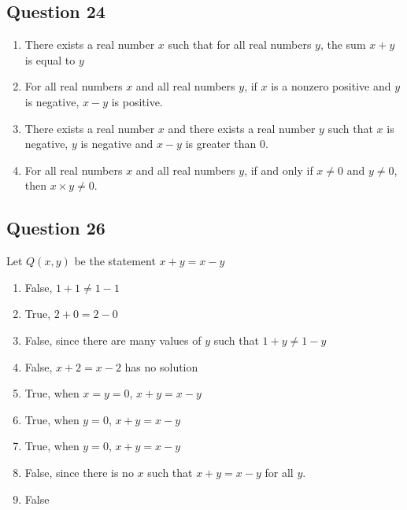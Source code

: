 \documentclass[12pt]{article}
\begin{document}
\subsection*{Question 24}

\begin{enumerate}[label=(\alph*)]
  \item There exists a real number $x$ such that for all real numbers $y$,
    the sum $x + y$ is equal to $y$
  \item For all real numbers $x$ and all real numbers $y$, if $x$ is a nonzero
    positive and $y$ is negative, $x - y$ is positive.
  \item There exists a real number $x$ and there exists a real number $y$ such
    that $x$ is negative, $y$ is negative and $x-y$ is greater than $0$.
  \item For all real numbers $x$ and all real numbers $y$, if and only if
    $x \ne 0$ and $y \ne 0$, then $x \times y \ne 0$.
\end{enumerate}

\subsection*{Question 26}

Let $Q(x, y)$ be the statement $x + y = x - y$

\begin{enumerate}[label=(\alph*)]
  \item False, $1 + 1 \ne 1 - 1$
  \item True, $2 + 0 = 2 - 0$
  \item False, since there are many values of $y$ such that $1 + y \ne 1 - y$
  \item False, $x + 2 = x - 2$ has no solution
  \item True, when $x = y = 0$, $ x + y = x - y$
  \item True, when $y = 0$, $x + y = x - y$
  \item True, when $y = 0$, $x + y = x - y$
  \item False, since there is no $x$ such that $x + y = x - y$ for all $y$.
  \item False
\end{enumerate}
\end{document}
